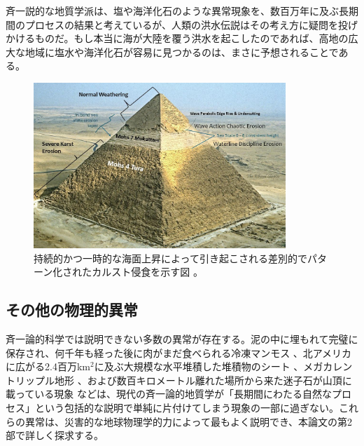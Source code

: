 \documentclass[10pt,twocolumn,letterpaper]{article}
\begin{document}
斉一説的な地質学派は、塩や海洋化石のような異常現象を、数百万年に及ぶ長期間のプロセスの結果と考えているが、人類の洪水伝説はその考え方に疑問を投げかけるものだ。もし本当に海が大陸を覆う洪水を起こしたのであれば、高地の広大な地域に塩水や海洋化石が容易に見つかるのは、まさに予想されることである。



\begin{figure}[t]
\begin{center}
\includegraphics[width=0.85\textwidth]{khafre.jpg}
\end{center}
   \caption{持続的かつ一時的な海面上昇によって引き起こされる差別的でパターン化されたカルスト侵食を示す図 \cite{27}。}
\label{fig:4}
\end{figure}

\subsection{その他の物理的異常}

斉一論的科学では説明できない多数の異常が存在する。泥の中に埋もれて完璧に保存され、何千年も経った後に肉がまだ食べられる冷凍マンモス \cite{17,18,19}、北アメリカに広がる2.4百万km$^2$に及ぶ大規模な水平堆積した堆積物のシート \cite{21}、メガカレントリップル地形 \cite{22}、および数百キロメートル離れた場所から来た迷子石が山頂に載っている現象 \cite{23,26} などは、現代の斉一論的地質学が「長期間にわたる自然なプロセス」という包括的な説明で単純に片付けてしまう現象の一部に過ぎない。これらの異常は、災害的な地球物理学的力によって最もよく説明でき、本論文の第2部で詳しく探求する。
\end{document}
